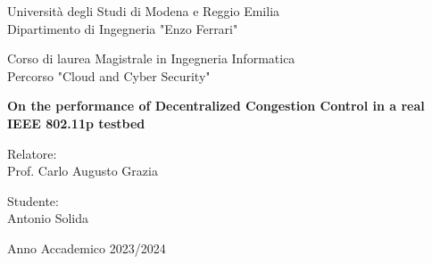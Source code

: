 \thispagestyle{plain}

\begin{titlepage}
    \begin{center}

		Università degli Studi di Modena e Reggio Emilia\\
		\large
		Dipartimento di Ingegneria "Enzo Ferrari"

        \vspace{2.5cm}
        
		\Large
		Corso di laurea Magistrale in Ingegneria Informatica\\
		
		\large
		Percorso "Cloud and Cyber Security"		
		
		\vspace{3cm}
        
        \Huge
        \textbf{On the performance of Decentralized Congestion Control in a real IEEE 802.11p testbed}

        \vspace{2cm}

        \Large
        \vfill %
        
        \noindent
        \begin{minipage}[t]{0.5\textwidth}
            \raggedright
            Relatore:\\
            Prof. Carlo Augusto Grazia
        \end{minipage}%
        \begin{minipage}[t]{0.5\textwidth}
            \raggedleft
            Studente:\\
            Antonio Solida
        \end{minipage}

        \vspace{2cm}
		
		\small
		Anno Accademico 2023/2024
            
    \end{center}
\end{titlepage}
